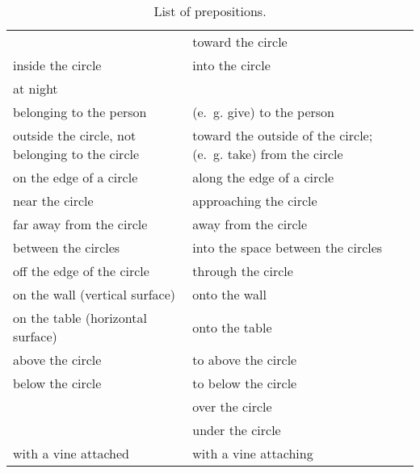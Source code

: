 \documentclass{book}
\begin{document}
\begin{longtabu}[c]{|X|X|}
    \caption{List of prepositions.}
    \centering
    
    \\ \hline
    \endfirsthead
    
    \hline
    \endhead
    
    \hline
    \endfoot
    
    \hline
    \endlastfoot
    
    &  toward the circle \\
    \hline
     inside the circle &  into the circle \\
     at night & \\
     belonging to the person &  (e.~g. give) to the person \\
     outside the circle, not belonging to the circle &  toward the outside of the circle; (e.~g. take) from the circle \\
     on the edge of a circle &  along the edge of a circle \\
     near the circle &  approaching the circle \\
     far away from the circle &  away from the circle \\
     between the circles &  into the space between the circles \\
     off the edge of the circle &  through the circle \\
     on the wall (vertical surface) &  onto the wall \\
     on the table (horizontal surface) &  onto the table \\
     above the circle &  to above the circle \\
     below the circle &  to below the circle \\
    &  over the circle \\
    &  under the circle \\
     with a vine attached &  with a vine attaching \\

\end{longtabu}
\end{document}
